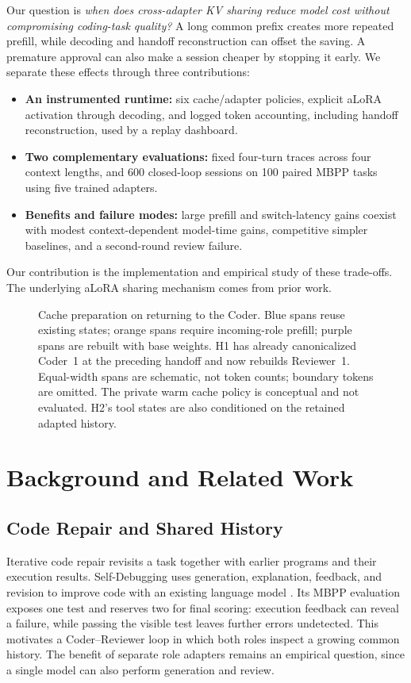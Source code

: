 \documentclass[10pt,twocolumn,letterpaper]{article}
\begin{document}
Our question is \emph{when does cross-adapter KV sharing reduce model cost
without compromising coding-task quality?} A long common prefix creates
more repeated prefill, while decoding and handoff reconstruction can offset
the saving. A premature approval can also make a session cheaper by stopping
it early. We separate these effects through three contributions:

\begin{itemize}
  \item \textbf{An instrumented runtime:} six cache/adapter policies,
    explicit aLoRA activation through decoding, and logged token accounting,
    including handoff reconstruction, used by a replay dashboard.
  \item \textbf{Two complementary evaluations:} fixed four-turn traces
    across four context lengths, and 600 closed-loop sessions on 100 paired
    MBPP tasks \cite{austin2021mbpp} using five trained adapters.
  \item \textbf{Benefits and failure modes:} large prefill and
    switch-latency gains coexist with modest context-dependent model-time
    gains, competitive simpler baselines, and a second-round review failure.
\end{itemize}
Our contribution is the implementation and empirical study of these trade-offs.
The underlying aLoRA sharing mechanism comes from prior work.

\begin{figure}[t]
\centering

\caption{Cache preparation on returning to the Coder. Blue spans reuse
existing states; orange spans require incoming-role prefill; purple spans
are rebuilt with base weights. H1 has already canonicalized Coder~1 at the
preceding handoff and now rebuilds Reviewer~1. Equal-width spans are
schematic, not token counts; boundary tokens are omitted. The private warm
cache policy is conceptual and not evaluated. H2's tool states are also
conditioned on the retained adapted history.}
\label{fig:cache-handoff}
\end{figure}

\section{Background and Related Work}
\label{sec:background}

\subsection{Code Repair and Shared History}
Iterative code repair revisits a task together with earlier programs and their
execution results. Self-Debugging uses generation, explanation, feedback, and
revision to improve code with an existing language model
\cite{chen2023selfdebug}. Its MBPP evaluation exposes one test and reserves
two for final scoring: execution feedback can reveal a failure, while passing
the visible test leaves further errors undetected. This motivates a
Coder--Reviewer loop in which both roles inspect a growing common history.
The benefit of separate role adapters remains an empirical question, since a
single model can also perform generation and review.
\end{document}
